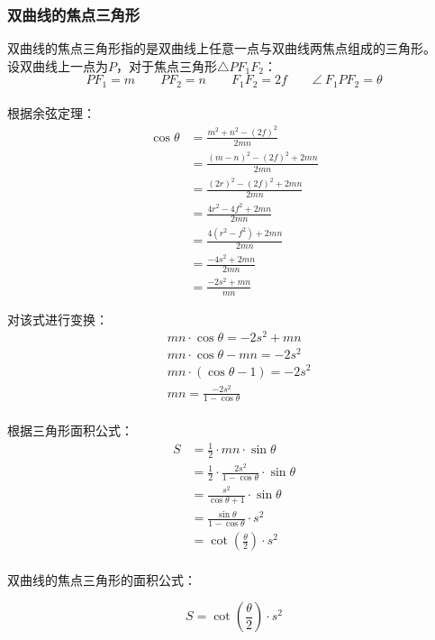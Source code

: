 \documentclass[UTF8]{ctexart}
\begin{document}
\subsubsection{双曲线的焦点三角形}
    双曲线的焦点三角形指的是双曲线上任意一点与双曲线两焦点组成的三角形。\\[3mm]
    设双曲线上一点为$P$，对于焦点三角形$\triangle PF_1F_2$：
    \setcounter{equation}{0}
    \begin{equation}
        PF_1=m\qquad PF_2=n\qquad F_1F_2=2f\qquad \angle~ F_1PF_2=\theta
    \end{equation}\\
    根据余弦定理：
    \begin{align}
        \cos{\theta}
        &=\frac{m^2+n^2-(2f)^2}{2mn}\\[5mm]
        &=\frac{(m-n)^2-(2f)^2+2mn}{2mn}\\[5mm]
        &=\frac{(2r)^2-(2f)^2+2mn}{2mn}\\[5mm]
        &=\frac{4r^2-4f^2+2mn}{2mn}\\[5mm]
        &=\frac{4(r^2-f^2)+2mn}{2mn}\\[5mm]
        &=\frac{-4s^2+2mn}{2mn}\\[5mm]
        &=\frac{-2s^2+mn}{mn}
    \end{align}

    对该式进行变换：
    \begin{align}
        &mn\cdot\cos{\theta}=-2s^2+mn\\[3mm]
        &mn\cdot\cos{\theta}-mn=-2s^2\\[3mm]
        &mn\cdot(\cos{\theta}-1)=-2s^2\\[3mm]
        &mn=\frac{-2s^2}{1-\cos{\theta}}
    \end{align}\\
    根据三角形面积公式：
    \begin{align}
        S&=\frac{1}{2}\cdot mn\cdot\sin{\theta}\\[5mm]
        &=\frac{1}{2}\cdot \frac{2s^2}{1-\cos{\theta}}\cdot\sin{\theta}\\[5mm]
        &=\frac{s^2}{\cos{\theta}+1}\cdot\sin{\theta}\\[5mm]
        &=\frac{\sin{\theta}}{1-\cos{\theta}}\cdot s^2\\[5mm]
        &=\cot{\left(\frac{\theta}{2}\right)}\cdot s^2
    \end{align}\\
    双曲线的焦点三角形的面积公式：
    \begin{large}
        \begin{equation*}
            S=\cot{\left(\frac{\theta}{2}\right)}\cdot s^2
        \end{equation*}
    \end{large}
\end{document}

